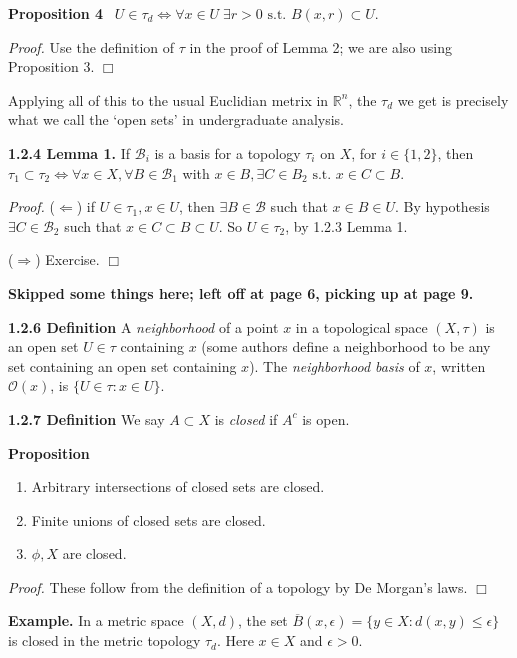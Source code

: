 \documentclass[12pt]{article}
\newcommand{\st}[0]{ \textrm{ s.t. } }
\newcommand{\rimply}[0] { \Rightarrow }
\newcommand{\limply}[0] { \Leftarrow }
\newcommand{\lrimply}[0] { \Leftrightarrow }
\newcommand{\reals}[0] { \mathbb{R}}
\newcommand{\eps}[0] {  \epsilon }
\newcommand{\B}[0] { \mathcal{B} }
\newcommand{\curlyO}[0] { \mathcal{O} }
\begin{document}
\begin{flushleft} 
 { \bf Proposition 4 } \ $U \in \tau_d \lrimply \forall x \in U \; \exists r>0 \st B(x,r) \subset U$.\begin{flushleft} 
 \emph{Proof.  }Use the definition of $\tau$ in the proof of Lemma 2;
we are  also using Proposition 3. $\Box$ \end{flushleft}

\end{flushleft}\begin{flushleft} 
 Applying all of this to the usual Euclidian metrix in $\reals^n$, the $\tau_d$ 
we get is precisely what we call the `open sets' in undergraduate analysis.
\end{flushleft}\begin{flushleft} 
 { \bf 1.2.4 Lemma  1. }  If $\B_i$ is a basis for a topology $\tau_i$ on $X$,
for 
 $i \in \{1,2\}$, then $\tau_1 \subset \tau_2 \lrimply \forall x \in X, \forall B \in \B_1$ with $x \in B, \exists C \in B_2 \st x \in C \subset B$. \\
\end{flushleft} \begin{flushleft}  
 \emph{Proof.  }($\limply$) if $U \in \tau_1, x \in U$, then $\exists B \in \B$ such that $x \in B \in U$. By hypothesis $\exists C \in \B_2$ such that
$x \in C \subset B \subset U$. So $U \in \tau_2$, by 1.2.3 
Lemma 1.

($\rimply$) Exercise.
 $\Box$
\end{flushleft} { \bf Skipped some things here; left off at page 6, picking up at page 9.}\begin{flushleft} 
 { \bf 1.2.6 Definition }A \emph{neighborhood} of a point $x$ in a topological space $(X, \tau)$ is an open set $U \in \tau$ containing $x$ (some authors define a neighborhood to be 
 any set containing an open set containing  $x$). The \emph{neighborhood basis} of $x$, written $\curlyO(x)$,  is $\{ U \in \tau :  x \in U\}$.\end{flushleft}\begin{flushleft} 
 { \bf 1.2.7 Definition }We say $A \subset X$ is \emph{closed} if $A^c$ is open.\end{flushleft}\begin{flushleft} 
 { \bf Proposition }\begin{enumerate}
\item
                Arbitrary intersections of closed sets are closed.
            \item
                Finite unions of closed sets are closed.
            \item
                $\phi, X$ are closed.
            \end{enumerate}\begin{flushleft} 
 \emph{Proof.  } These follow from the definition of a 
topology by De Morgan's laws. $\Box$
  \end{flushleft}\end{flushleft}\begin{flushleft} 
 { \bf Example.} In a metric space $(X, d)$, the set
$\overline{B}(x, \eps) = \{ y \in X :  d(x,y) \le \eps \}$ is 
closed in the metric topology $\tau_d$. Here $x \in X$ and $\eps > 0$.
\end{flushleft} 
\end{document}
